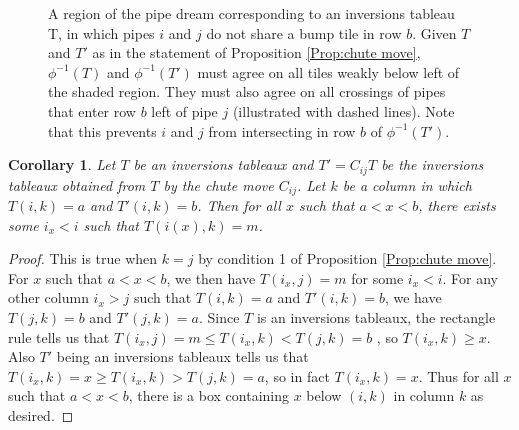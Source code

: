 \documentclass{article}
\newcommand{\shadedsquares}[2][]{
	\foreach \i/\j in {#2} {
  		\draw[shadedsquare,#1] (\j-0.5,-\i+0.5);
	}
}
\newtheorem{corollary}[theorem]{Corollary}
\theoremstyle{definition}
\begin{document}
\begin{figure}
        \centering
        \caption{A region of the pipe dream corresponding to an inversions tableau T, in which pipes $i$ and $j$ do not share a bump tile in row $b$. Given $T$ and $T'$ as in the statement of Proposition \ref{Prop:chute move}, $\phi^{-1}(T)$ and $\phi^{-1}(T')$ must agree on all tiles weakly below left of the shaded region. They must also agree on all crossings of pipes that enter row $b$ left of pipe $j$ (illustrated with dashed lines). Note that this prevents $i$ and $j$ from intersecting in row $b$ of $\phi^{-1}(T')$.}
        \label{fig:IT-bump}
    \end{figure}

\begin{corollary}
\label{cor:chute on column}
Let $T$ be an inversions tableaux and $T'=C_{ij}T$ be the inversions tableaux obtained from $T$ by the chute move $C_{ij}$. Let $k$ be a column in which $T(i,k)=a$ and $T'(i,k)=b$. Then for all $x$ such that $a<x<b$, there exists some $i_x < i$ such that $T(i(x),k) = m$.
   \end{corollary}

   \begin{proof}
    This is true when $k=j$ by condition 1 of Proposition \ref{Prop:chute move}. For $x$ such that $a<x<b$, we then have $T(i_x,j) = m$ for some $i_x <i$. For any other column $i_x>j$ such that $T(i,k)=a$ and $T'(i,k)=b$, we have $T(j,k)=b$ and $T'(j,k)=a$.
    Since $T$ is an inversions tableaux, the rectangle rule tells us that $T(i_x,j) = m \leq T(i_x,k) < T(j,k) = b$ , so $T(i_x,k) \geq x$. Also $T'$ being an inversions tableaux tells us that $T(i_x,k) = x \geq T(i_x,k) > T(j,k) = a$, so in fact $T(i_x,k)=x$. Thus for all $x$ such that $a < x < b$, there is a box containing $x$ below $(i,k)$ in column $k$ as desired.
\end{proof}
\end{document}
